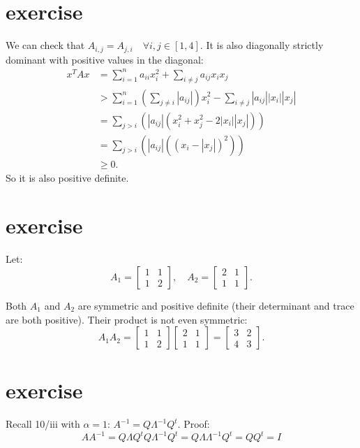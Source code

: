 \documentclass{article}
\begin{document}
\section{exercise}
We can check that $A_{i,j}=A_{j,i} \quad \forall i,j \in [1,4]$.
It is also diagonally strictly dominant with positive values in the diagonal:
\begin{align*}
    x^T A x & = \sum_{i=1}^n a_{ii} x_i^2 + \sum_{i \neq j} a_{ij} x_i x_j                                       \\
            & > \sum_{i=1}^n \left( \sum_{j \neq i} |a_{ij}| \right) x_i^2 - \sum_{i \neq j} |a_{ij}| |x_i||x_j| \\
            & = \sum_{j > i} \left( |a_{ij}| \left( x_i^2 + x_j^2 - 2|x_i||x_j| \right) \right)                  \\
            & = \sum_{j > i} \left( |a_{ij}| \left( (x_i - |x_j|)^2 \right) \right)                              \\
            & \geq 0.
\end{align*}
So it is also positive definite.
\section{exercise}

Let:
\[
    A_1 = \begin{bmatrix} 1 & 1 \\ 1 & 2 \end{bmatrix}, \quad A_2 = \begin{bmatrix} 2 & 1 \\ 1 & 1 \end{bmatrix}.
\]

Both \( A_1 \) and \( A_2 \) are symmetric and positive definite (their determinant and trace are both positive). Their product is not even symmetric:
\[
    A_1 A_2 = \begin{bmatrix} 1 & 1 \\ 1 & 2 \end{bmatrix} \begin{bmatrix} 2 & 1 \\ 1 & 1 \end{bmatrix} = \begin{bmatrix} 3 & 2 \\ 4 & 3 \end{bmatrix}.
\]

\section{exercise}
Recall 10/iii with $\alpha=1$: $A^{-1} = Q\Lambda^{-1}Q^t$. Proof: \[A{A^{ - 1}} = Q\Lambda {Q^t}Q{\Lambda ^{ - 1}}{Q^t} = Q\Lambda {\Lambda ^{ - 1}}{Q^t} = Q{Q^t} = I\]
\end{document}
